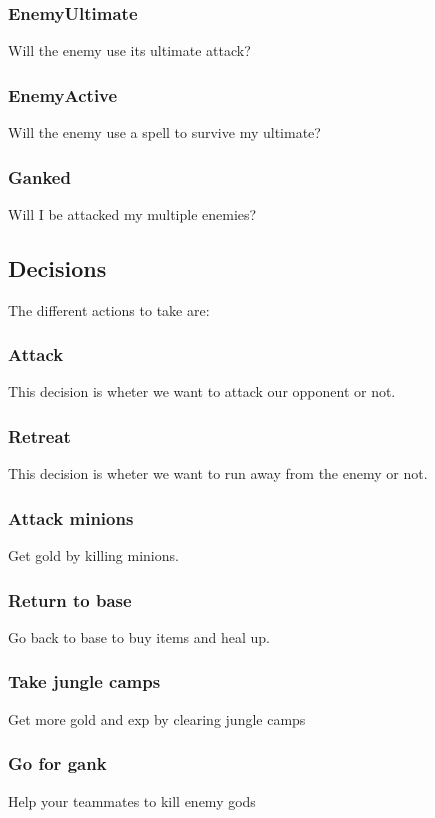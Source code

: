 \documentclass[titlepage]{article}
\begin{document}
\subsubsection*{EnemyUltimate}
Will the enemy use its ultimate attack?

\subsubsection*{EnemyActive}
Will the enemy use a spell to survive my ultimate? 

\subsubsection*{Ganked}
Will I be attacked my multiple enemies? 


\subsection{Decisions}
The different actions to take are:
\subsubsection*{Attack}
This decision is wheter we want to attack our opponent or not.
\subsubsection*{Retreat}
This decision is wheter we want to run away from the enemy or not.
\subsubsection*{Attack minions}
Get gold by killing minions.
\subsubsection*{Return to base}
Go back to base to buy items and heal up.
\subsubsection*{Take jungle camps}
Get more gold and exp by clearing jungle camps
\subsubsection*{Go for gank}
Help your teammates to kill enemy gods
\end{document}
